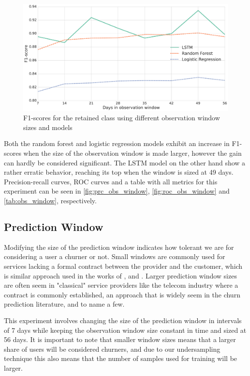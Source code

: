 \documentclass{kththesis}
\begin{document}
\begin{figure}
    \centering
    \includegraphics[width=1.0\textwidth,keepaspectratio]{figures/line_obs_window_retained.pdf}
    \caption{F1-scores for the retained class using different observation window sizes and models}
    \label{fig:line_obs_window_ret}
\end{figure}

Both the random forest and logistic regression models exhibit an increase in F1-scores when the size of the observation window is made larger, however the gain can hardly be considered significant. The LSTM model on the other hand show a rather erratic behavior, reaching its top when the window is sized at 49 days. Precision-recall curves, ROC curves and a table with all metrics for this experiment can be seen in \autoref{fig:prc_obs_window}, \autoref{fig:roc_obs_window} and \autoref{tab:obs_window}, respectively.

\subsection{Prediction Window}

Modifying the size of the prediction window indicates how tolerant we are for considering a user a churner or not. Small windows are commonly used for services lacking a formal contract between the provider and the customer, which is similar approach used in the works of \citep{Dror2012}, \citep{Runge2014} and \citep{Pudipeddi2014}. Larger prediction window sizes are often seem in "classical" service providers like the telecom industry where a contract is commonly established, an approach that is widely seem in the churn prediction literature, \citep{Khan2015} and \citep{Hassouna2015} to name a few.

This experiment involves changing the size of the prediction window in intervals of 7 days while keeping the observation window size constant in time and sized at 56 days. It is important to note that smaller window sizes means that a larger share of users will be considered churners, and due to our undersampling technique this also means that the number of samples used for training will be larger. 
\end{document}
